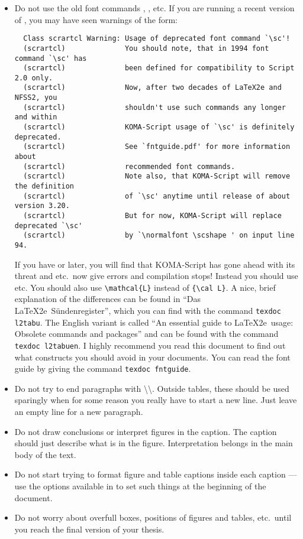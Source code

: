 \begin{itemize}
\item Do not use the old font commands , ,  etc.
  If you are running a recent version of \TeXLive, you may have seen warnings of the form:
  {\small
  \begin{verbatim}
  Class scrartcl Warning: Usage of deprecated font command `\sc'!
  (scrartcl)              You should note, that in 1994 font command `\sc' has
  (scrartcl)              been defined for compatibility to Script 2.0 only.
  (scrartcl)              Now, after two decades of LaTeX2e and NFSS2, you
  (scrartcl)              shouldn't use such commands any longer and within
  (scrartcl)              KOMA-Script usage of `\sc' is definitely deprecated.
  (scrartcl)              See `fntguide.pdf' for more information about
  (scrartcl)              recommended font commands.
  (scrartcl)              Note also, that KOMA-Script will remove the definition
  (scrartcl)              of `\sc' anytime until release of about version 3.20.
  (scrartcl)              But for now, KOMA-Script will replace deprecated `\sc'
  (scrartcl)              by `\normalfont \scshape ' on input line 94.
  \end{verbatim}
  }
  If you have  or later, you will find that KOMA-Script has gone ahead with its threat
  and  etc.\ now give errors and compilation stops!
  Instead you should use  etc.
  You should also use \verb|\mathcal{L}| instead of \verb|{\cal L}|.
  A nice, brief explanation of the differences can be found in \foreignlanguage{ngerman}{\enquote{Das \LaTeX2e\ Sündenregister}},
  which you can find with the command \texttt{texdoc l2tabu}.
  The English variant is called \enquote{An essential guide to \LaTeX2e\ usage: Obsolete commands and packages}
  and can be found with the command \texttt{texdoc l2tabuen}.
  I highly recommend you read this document to find out what constructs you should avoid in your documents.
  You can read the font guide by giving the command \texttt{texdoc fntguide}.

\item Do not try to end paragraphs with
  \textbackslash\textbackslash. 
  Outside tables, these should be used sparingly when
  for some reason you really have to start a new line.
  Just leave an empty line for a new paragraph.

\item Do not draw conclusions or interpret figures in the caption. The
  caption should just describe what is in the figure. Interpretation
  belongs in the main body of the text.

\item Do not start trying to format figure and table captions inside
  each caption --- use the options available in \KOMAScript{} to set
  such things at the beginning of the document.

\item Do not worry about overfull boxes, positions of figures
  and tables, etc.\ until you reach the final version of your thesis.
\end{itemize}


